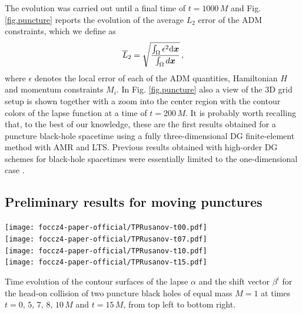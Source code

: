 The evolution was carried out until a final time of $t=1000\,M$ and
Fig. \ref{fig.puncture} reports the evolution of the average $L_2$ error
of the ADM constraints, which we define as
%
\begin{equation*}
\overline{L}_2 = \sqrt{ \frac{\int_\Omega \epsilon^2
    \mathrm{d}\boldsymbol{x}}{\int_\Omega d\boldsymbol{x} } }\,,
\end{equation*}
%
where $\epsilon$ denotes the local error of each of the ADM quantities,
\ie Hamiltonian $H$ and momentum constraints $M_i$. In Fig. \ref{fig.puncture}
also a view of the 3D grid setup is shown together with a zoom into the center 
region with the contour colors of the lapse function at a time of $t=200\,M$.  
%
It is probably worth recalling that, to the best of our knowledge, these
are the first results obtained for a puncture black-hole spacetime using
a fully three-dimensional DG finite-element method with AMR and LTS.
Previous results obtained with high-order DG schemes for black-hole
spacetimes were essentially limited to the one-dimensional case 
\cite{field10, Brown2012, Miller2016}.

\newpage
\subsection{Preliminary results for moving punctures}\label{sec.movpunct}
\begin{marginfigure}
	\texttt{[image: foccz4-paper-official/TPRusanov-t00.pdf]} 
	\\[.3em]
	\texttt{[image: foccz4-paper-official/TPRusanov-t07.pdf]}
	\\[.3em]
	\texttt{[image: foccz4-paper-official/TPRusanov-t10.pdf]}
	\\[.3em]
	\texttt{[image: foccz4-paper-official/TPRusanov-t15.pdf]}
	\caption[
	  BH-BH head-on collision, time evolution snapshots, 
	]{Time evolution of the contour surfaces of the lapse $\alpha$
		and the shift vector $\beta^i$ for the head-on collision of two
		puncture black holes of equal mass $M=1$ at times
		$t=0,\,5,\,7,\,8,\,10\,M$ and $t=15\,M$, from top left to bottom
		right.}
	\label{fig.twopunctures}
\end{marginfigure}

